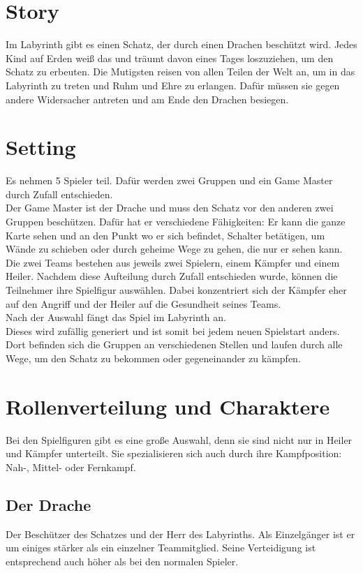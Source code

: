 \documentclass[10pt,a4paper,notitlepage]{report}
\begin{document}
\begin{flushleft}
\section{Story}
Im Labyrinth gibt es einen Schatz, der durch einen Drachen beschützt wird. Jedes Kind auf Erden weiß das und träumt davon eines Tages loszuziehen, um den Schatz zu erbeuten. Die Mutigsten reisen von allen Teilen der Welt an, um in das Labyrinth zu treten und Ruhm und Ehre zu erlangen. Dafür müssen sie gegen andere Widersacher antreten und am Ende den Drachen besiegen.\\
\section{Setting}
Es nehmen 5 Spieler teil. Dafür werden zwei Gruppen und ein Game Master durch Zufall entschieden.\\
Der Game Master ist der Drache und muss den Schatz vor den anderen zwei Gruppen beschützen. Dafür hat er verschiedene Fähigkeiten: Er kann die ganze Karte sehen und an den Punkt wo er sich befindet, Schalter betätigen, um Wände zu schieben oder durch geheime Wege zu gehen, die nur er sehen kann.\\
Die zwei Teams bestehen aus jeweils zwei Spielern, einem Kämpfer und einem Heiler. Nachdem diese Aufteilung durch Zufall entschieden wurde, können die Teilnehmer ihre Spielfigur auswählen. Dabei konzentriert sich der Kämpfer eher auf den Angriff und der Heiler auf die Gesundheit seines Teams.\\
Nach der Auswahl fängt das Spiel im Labyrinth an. \\
Dieses wird zufällig generiert und ist somit bei jedem neuen Spielstart anders. Dort befinden sich die Gruppen an verschiedenen Stellen und laufen durch alle Wege, um den Schatz zu bekommen oder gegeneinander zu kämpfen.\\
\section{Rollenverteilung und Charaktere}
Bei den Spielfiguren gibt es eine große Auswahl, denn sie sind nicht nur in Heiler und Kämpfer unterteilt. Sie spezialisieren sich auch durch ihre Kampfposition: Nah-, Mittel- oder Fernkampf.\\
\subsection{Der Drache} 
Der Beschützer des Schatzes und der Herr des Labyrinths. Als Einzelgänger ist er um einiges stärker als ein einzelner Teammitglied. Seine Verteidigung ist entsprechend auch höher als bei den normalen Spieler.\\

\end{flushleft}
\end{document}
